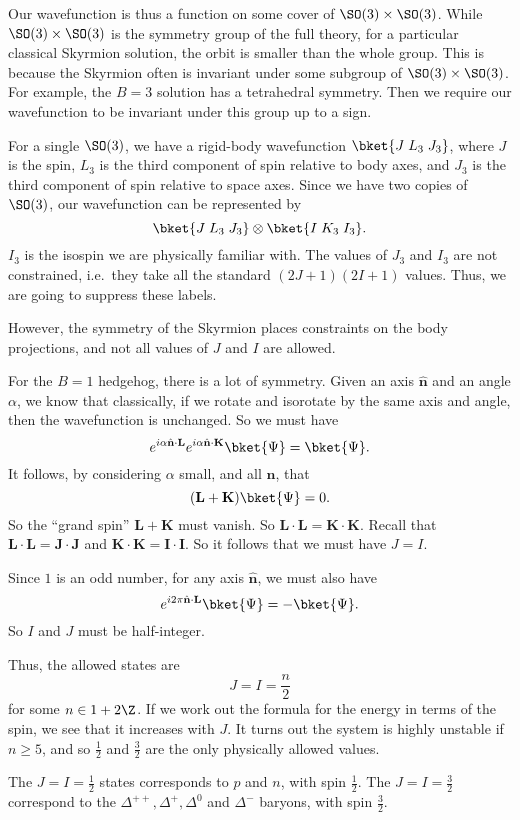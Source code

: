 \documentclass[a4paper]{article}
\begin{document}
Our wavefunction is thus a function on some cover of $\SO(3) \times \SO(3)$. While $\SO(3) \times \SO(3)$ is the symmetry group of the full theory, for a particular classical Skyrmion solution, the orbit is smaller than the whole group. This is because the Skyrmion often is invariant under some subgroup of $\SO(3) \times \SO(3)$. For example, the $B = 3$ solution has a tetrahedral symmetry. Then we require our wavefunction to be invariant under this group up to a sign.

For a single $\SO(3)$, we have a rigid-body wavefunction $\bket{J\; L_3\; J_3}$, where $J$ is the spin, $L_3$ is the third component of spin relative to body axes, and $J_3$ is the third component of spin relative to space axes. Since we have two copies of $\SO(3)$, our wavefunction can be represented by
\[
  \bket{J\; L_3\; J_3} \otimes \bket{I\; K_3\; I_3}.
\]
$I_3$ is the isospin we are physically familiar with. The values of $J_3$ and $I_3$ are not constrained, i.e.\ they take all the standard $(2J + 1)(2I + 1)$ values. Thus, we are going to suppress these labels.

However, the symmetry of the Skyrmion places constraints on the body projections, and not all values of $J$ and $I$ are allowed.

\begin{eg}
  For the $B = 1$ hedgehog, there is a lot of symmetry. Given an axis $\hat{\mathbf{n}}$ and an angle $\alpha$, we know that classically, if we rotate and isorotate by the same axis and angle, then the wavefunction is unchanged. So we must have
  \[
    e^{i \alpha \hat{\mathbf{n}} \cdot \mathbf{L}} e^{i \alpha \hat{\mathbf{n}} \cdot \mathbf{K}} \bket{\Psi} = \bket{\Psi}.
  \]
  It follows, by considering $\alpha$ small, and all $\hat{\mathbf{n}}$, that
  \[
    (\mathbf{L} + \mathbf{K}) \bket{\Psi} = 0.
  \]
  So the ``grand spin'' $\mathbf{L} + \mathbf{K}$ must vanish. So $\mathbf{L} \cdot \mathbf{L} = \mathbf{K} \cdot \mathbf{K}$. Recall that $\mathbf{L} \cdot \mathbf{L} = \mathbf{J} \cdot \mathbf{J}$ and $\mathbf{K} \cdot \mathbf{K} = \mathbf{I} \cdot \mathbf{I}$. So it follows that we must have $J = I$.

  Since $1$ is an odd number, for any axis $\hat{\mathbf{n}}$, we must also have
  \[
    e^{i 2\pi \hat{\mathbf{n}} \cdot \mathbf{L}} \bket{\Psi} = - \bket{\Psi}.
  \]
  So $I$ and $J$ must be half-integer.

  Thus, the allowed states are
  \[
    J = I = \frac{n}{2}
  \]
  for some $n \in 1 + 2\Z$. If we work out the formula for the energy in terms of the spin, we see that it increases with $J$. It turns out the system is highly unstable if $n \geq 5$, and so $\frac{1}{2}$ and $\frac{3}{2}$ are the only physically allowed values.

  The $J = I = \frac{1}{2}$ states corresponds to $p$ and $n$, with spin $\frac{1}{2}$. The $J = I = \frac{3}{2}$ correspond to the $\Delta^{++}, \Delta^+, \Delta^0$ and $\Delta^-$ baryons, with spin $\frac{3}{2}$.
\end{eg}
\end{document}
